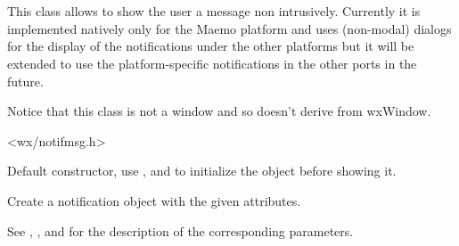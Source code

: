 
\section{}\label{wxnotificationmessage}

This class allows to show the user a message non intrusively. Currently it is
implemented natively only for the Maemo platform and uses (non-modal) dialogs
for the display of the notifications under the other platforms but it will be
extended to use the platform-specific notifications in the other ports in the
future.

Notice that this class is not a window and so doesn't derive from wxWindow.




<wx/notifmsg.h>



\label{wxnotificationmessagewxnotificationmessage}


Default constructor, use , 
 and 
 to initialize the object
before showing it.



Create a notification object with the given attributes.

See , 
, 
 and
 for the description of the
corresponding parameters.


